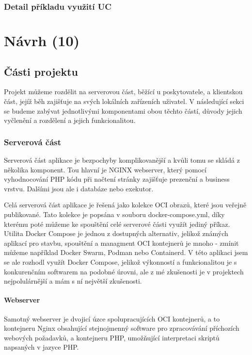 \subsection{Detail příkladu využití UC}

\chapter{Návrh (10)}

\section{Části projektu}
Projekt můžeme rozdělit na serverovou část, běžící u poskytovatele, a klientskou část, jejíž běh zajišťuje na svých lokálních zařízeních uživatel. V následující sekci se budeme zabývat jednotlivými komponentami obou těchto částí, důvody jejich vyčlenění a rozdělení a jejich funkcionalitou.

\subsection{Serverová část}
Serverová část aplikace je bezpochyby komplikovanější a kvůli tomu se skládá z několika komponent. Tou hlavní je NGINX webserver, který pomocí vyhodnocování PHP kódu při načtení stránky zajišťuje prezenční a business vrstvu. Dalšími jsou ale i databáze nebo exekutor.

Celá serverová část aplikace je řešená jako kolekce OCI obrazů, které jsou veřejně publikované. Tato kolekce je popsána v souboru docker-compose.yml, díky kterému poté můžeme ke spouštění celé serverové části využít jediný příkaz. Utilita Docker Compose je jednou z dostupných alternativ, jelikož známých aplikací pro stavbu, spouštění a managment OCI kontejnerů je mnoho - zmínit můžeme například Docker Swarm, Podman nebo Containerd. V této aplikaci jsem se ale rozhodl využít Docker Compose, jelikož výkonností a funkcionalitou je s konkurenčním softwarem na podobné úrovni, ale z mé zkušenosti je v projektech nejpolulárnější a mám s ní největší zkušenosti.

\subsubsection{Webserver}
Samotný webserver je dvojicí úzce spolupracujících OCI kontejnerů, a to kontejneru Nginx obsahující stejnojmenný software pro zpracovávání příchozích webových požadavků, a kontejneru PHP, umožňující interpretaci skriptů napsaných v jazyce PHP.

